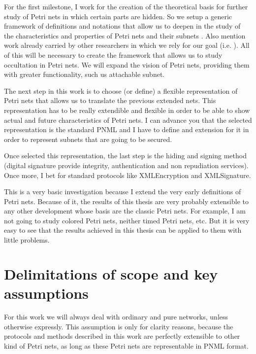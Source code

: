 For the first milestone, I work for the creation
of the theoretical basis for further study of Petri nets
in which certain parts are hidden. So we setup
a generic framework of definitions and notations that allow us to deepen
in the study of the characteristics and properties of Petri nets and their
subnets \citep{G-Murata1989541,G-Silva1985}.
Also mention work already carried
by other researchers in which we rely for
our goal (i.e. \citep{SM-Silva19931,EPN-David2010,EPN-Jensen2009,G-EPN-Peterson1981}). All of this will be necessary to create the framework that allows us to study occultation in Petri nets. We will expand the vision of Petri nets, providing them with greater functionality,
such us attachable subnet.

The next step in this work is to choose (or define) a flexible representation of Petri
nets that allows us to translate the previous extended nets. This representation has to be really extendible and flexible in order to be able to show actual and future characteristics of Petri nets.
I can advance you that the selected representation is the standard PNML and I have to define and extension for it in order to represent subnets that are going to
be secured.

Once selected this representation, the last step is the hiding and signing
method (digital signature provide integrity, authentication and
non repudiation services). Once
more, I bet for standard protocols like XMLEncryption and XMLSignature.

This is a very basic investigation because I extend the very early
definitions of Petri nets. Because of it, the results of this thesis are very probably extensible to any other development whose basis are the classic Petri nets. For example, I am not going to study colored Petri nets, neither timed
Petri nets, etc. But it is very easy to see that the results achieved in
this thesis can be applied to them with little problems.  

\section{Delimitations of scope and key assumptions}  
For this work we will always deal with ordinary and pure networks, unless otherwise expressly. This assumption is only for clarity reasons, because
the protocols and methods described in this work are perfectly extensible
to other kind of Petri nets, as long as these Petri nets are representable
in PNML format.





